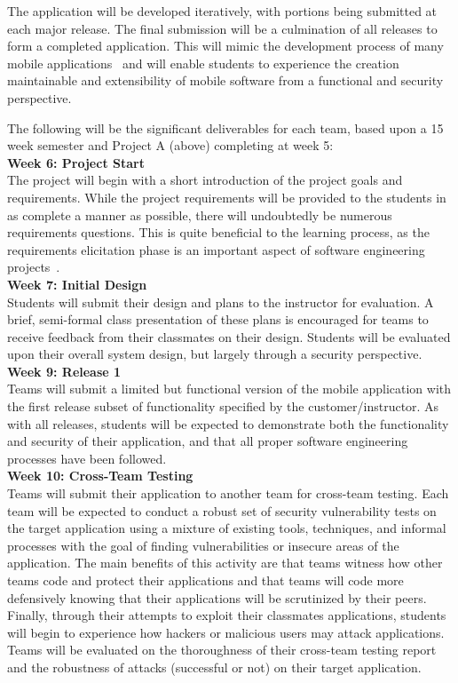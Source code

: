 \documentclass[conference]{IEEEtran}
\begin{document}
The application will be developed iteratively, with portions being submitted at each major release. The final submission will be a culmination of all releases to form a completed application. This will mimic the development process of many mobile applications~\cite{Abrahamsson:2004:MAA:1028664.1028736,Scharff:2010:SSM:1833310.1833315} and will enable students to experience the creation maintainable and extensibility of mobile software from a functional and security perspective.

The following will be the significant deliverables for each team, based upon a 15 week semester and Project A (above) completing at week 5: \\

\textbf{Week 6: Project Start}\\
The project will begin with a short introduction of the project goals and requirements. While the project requirements will be provided to the students in as complete a manner as possible, there will undoubtedly be numerous requirements questions. This is quite beneficial to the learning process, as the requirements elicitation phase is an important aspect of software engineering projects~\cite{pressman}. \\

\textbf{Week 7: Initial Design}\\
Students will submit their design and plans to the instructor for evaluation. A brief, semi-formal class presentation of these plans is encouraged for teams to receive feedback from their classmates on their design. Students will be evaluated upon their overall system design, but largely through a security perspective. \\

\textbf{Week 9: Release 1}\\
Teams will submit a limited but functional version of the mobile application with the first release subset of functionality specified by the customer/instructor. As with all releases, students will be expected to demonstrate both the functionality and security of their application, and that all proper software engineering processes have been followed. \\

\textbf{Week 10: Cross-Team Testing}\\
Teams will submit their application to another team for cross-team testing. Each team will be expected to conduct a robust set of security vulnerability tests on the target application using a mixture of existing tools, techniques, and informal processes with the goal of finding vulnerabilities or insecure areas of the application. The main benefits of this activity are that teams witness how other teams code and protect their applications and that teams will code more defensively knowing that their applications will be scrutinized by their peers. Finally, through their attempts to exploit their classmates applications, students will begin to experience how hackers or malicious users may attack applications. Teams will be evaluated on the thoroughness of their cross-team testing report and the robustness of attacks (successful or not) on their target application. \\
	
\end{document}
